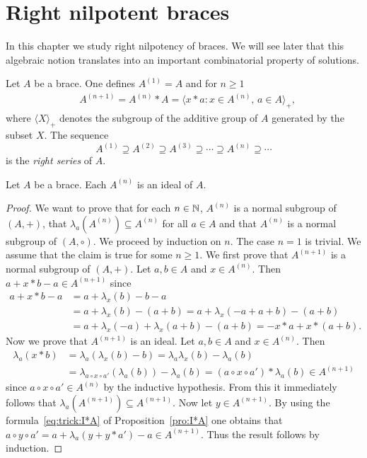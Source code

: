 \chapter{Right nilpotent braces}

In this chapter we study right nilpotency of braces. 
We will see later that this algebraic notion translates into an important combinatorial 
property of solutions. 

\begin{definition}
Let $A$ be a brace. 
One defines
$A^{(1)}=A$ and for $n\geq1$
\begin{align*}
    & A^{(n+1)}=A^{(n)}*A=\langle x*a: x\in A^{(n)},\,a\in A\rangle_+,
\end{align*}
where $\langle X\rangle_+$ denotes the subgroup of the additive group of $A$
generated by the subset $X$.  The sequence 
\[
A^{(1)}\supseteq A^{(2)}\supseteq
A^{(3)}\supseteq\cdots\supseteq A^{(n)}\supseteq\cdots
\]
is the \emph{right series} of $A$.
\end{definition}

\begin{proposition}
    \label{pro:right_series}
    Let $A$ be a brace. Each $A^{(n)}$ is an ideal of $A$.
\end{proposition}

\begin{proof}
    We want to prove that for each $n\in\mathbb{N}$, $A^{(n)}$ is a normal subgroup of
    $(A,+)$, that $\lambda_a(A^{(n)})\subseteq A^{(n)}$ for all $a\in A$ and
    that $A^{(n)}$ is a normal subgroup of $(A,\circ)$. We proceed by induction on $n$.
    The case $n=1$ is trivial. We assume that the claim is true for some $n\geq1$.  We first prove that
    $A^{(n+1)}$ is a normal subgroup of $(A,+)$. Let $a,b\in A$ and $x\in
    A^{(n)}$. Then $a+x*b-a\in A^{(n+1)}$ since
    \begin{align*}
        a+x*b-a&=a+\lambda_x(b)-b-a\\
        &=a+\lambda_x(b)-(a+b)
        =a+\lambda_x(-a+a+b)-(a+b)\\
        &=a+\lambda_x(-a)+\lambda_x(a+b)-(a+b)
        =-x*a+x*(a+b).
    \end{align*}
    Now we prove that $A^{(n+1)}$ is an ideal.
    Let $a,b\in A$ and $x\in A^{(n)}$. Then
\begin{equation}
    \label{eq:another_trick}
    \begin{aligned}
        \lambda_a(x*b)&=\lambda_a(\lambda_x(b)-b)
        =\lambda_a\lambda_x(b)-\lambda_a(b)\\
        &=\lambda_{a\circ x\circ a'}(\lambda_a(b))-\lambda_a(b)
        =(a\circ x\circ a')*\lambda_a(b)\in A^{(n+1)}
    \end{aligned}
\end{equation}
since $a\circ x\circ a'\in A^{(n)}$ by the inductive hypothesis.
From this it immediately follows that
$\lambda_a(A^{(n+1)})\subseteq A^{(n+1)}$.  Now let $y\in
A^{(n+1)}$. By using the formula~\eqref{eq:trick:I*A} of Proposition~\ref{pro:I*A} one obtains that
$a\circ y\circ a' =a+\lambda_a(y+y*a')-a\in A^{(n+1)}$. Thus
the result follows by induction.
\end{proof}

